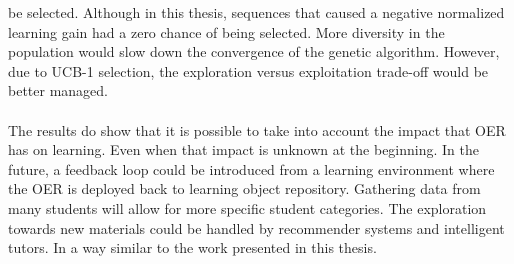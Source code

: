 be selected. Although in this thesis, sequences that caused a negative normalized
learning gain had a zero chance of being selected. More diversity in the
population would slow down the convergence of the genetic algorithm. However,
due to UCB-1 selection, the exploration versus exploitation trade-off would be
better managed.\\\\
\noindent
The results do show that it is possible to take into account the impact that
OER has on learning. Even when that impact is unknown at the beginning. In the
future, a feedback loop could be introduced from a learning environment where
the OER is deployed back to learning object repository. Gathering data from
many students will allow for more specific student categories. The exploration
towards new materials could be handled by recommender systems and intelligent
tutors. In a way similar to the work presented in this thesis.
